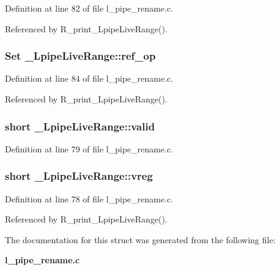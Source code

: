 Definition at line 82 of file l\_\-pipe\_\-rename.c.

Referenced by R\_\-print\_\-Lpipe\-Live\-Range().
\subsubsection{\setlength{\rightskip}{0pt plus 5cm}Set \bf{\_\-Lpipe\-Live\-Range::ref\_\-op}}\label{struct__LpipeLiveRange_3322ccbc352b6324d8879333cd04be7a}




Definition at line 84 of file l\_\-pipe\_\-rename.c.

Referenced by R\_\-print\_\-Lpipe\-Live\-Range().
\subsubsection{\setlength{\rightskip}{0pt plus 5cm}short \bf{\_\-Lpipe\-Live\-Range::valid}}\label{struct__LpipeLiveRange_e0b28e0aacadc13091deb968632d95a4}




Definition at line 79 of file l\_\-pipe\_\-rename.c.
\subsubsection{\setlength{\rightskip}{0pt plus 5cm}short \bf{\_\-Lpipe\-Live\-Range::vreg}}\label{struct__LpipeLiveRange_08170f2c5692ac735ea9803b16872f32}




Definition at line 78 of file l\_\-pipe\_\-rename.c.

Referenced by R\_\-print\_\-Lpipe\-Live\-Range().

The documentation for this struct was generated from the following file:\begin{CompactItemize}
\item 
\bf{l\_\-pipe\_\-rename.c}\end{CompactItemize}
